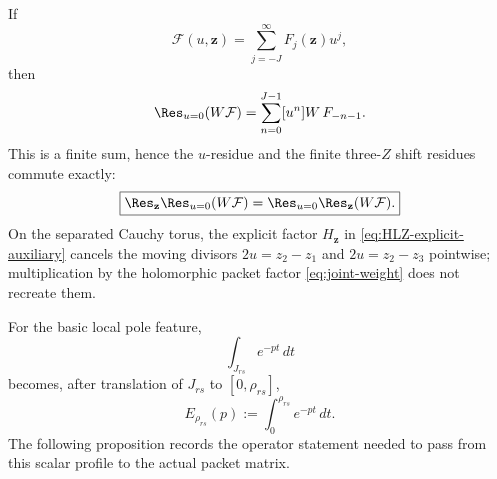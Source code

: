 If
\[
\mathcal F(u,\mathbf z)=\sum_{j=-J}^\infty F_j(\mathbf z)u^j,
\]
then
\[
\Res_{u=0}(W\mathcal F)
=\sum_{n=0}^{J-1}[u^n]W\,F_{-n-1}.
\]
This is a finite sum, hence the $u$-residue and the finite three-$Z$ shift
residues commute exactly:
\begin{equation}
\boxed{
\Res_{\mathbf z}\Res_{u=0}(W\mathcal F)
=\Res_{u=0}\Res_{\mathbf z}(W\mathcal F).
}
\label{eq:residue-commute}
\end{equation}
On the separated Cauchy torus, the explicit factor
$H_{\mathbf z}$ in \eqref{eq:HLZ-explicit-auxiliary} cancels the moving
divisors $2u=z_2-z_1$ and $2u=z_2-z_3$ pointwise; multiplication by the
holomorphic packet factor \eqref{eq:joint-weight} does not recreate them.

For the basic local pole feature,
\[
\int_{J_{rs}}e^{-pt}\,dt
\]
becomes, after translation of $J_{rs}$ to $[0,\rho_{rs}]$,
\[
E_{\rho_{rs}}(p):=\int_0^{\rho_{rs}}e^{-pt}\,dt.
\]
The following proposition records the operator statement needed to pass from
this scalar profile to the actual packet matrix.

